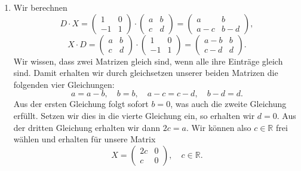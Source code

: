 \documentclass[german,12pt]{homework}
\newcommand{\RR}{\mathbb{R}}
\DeclarePairedDelimiter{\enbrace}{(}{)}
\begin{document}
\begin{enumerate}
\begin{align*}
{\begin{pmatrix}
                0 \cdot \enbrace*{-12} + 2 \cdot \enbrace*{-4} + 1 \cdot 1 & 0 \cdot 8 + 2 \cdot \enbrace*{-7} + 1 \cdot 12\\
            \end{pmatrix}\)}\\
            &= \begin{pmatrix}
                -29 & -3\\
                -7 & -2
            \end{pmatrix}.
        \end{align*}
        Somit ist gezeigt, dass die Multiplikation assoziativ ist.
        \item Wir berechnen
        \[D \cdot X = \begin{pmatrix}
            1 & 0\\
            -1 & 1
        \end{pmatrix} \cdot \begin{pmatrix}
            a & b\\
            c & d
        \end{pmatrix} = \begin{pmatrix}
            a & b\\
            a - c & b - d
        \end{pmatrix},\]
        \[X \cdot D = \begin{pmatrix}
            a & b\\
            c & d
        \end{pmatrix} \cdot \begin{pmatrix}
            1 & 0\\
            -1 & 1
        \end{pmatrix} = \begin{pmatrix}
            a - b & b\\
            c - d & d
        \end{pmatrix}.\]
        Wir wissen, dass zwei Matrizen gleich sind, wenn alle ihre Einträge gleich sind. Damit erhalten wir durch gleichsetzen unserer beiden Matrizen die folgenden vier Gleichungen:
        \[a = a - b, \quad b = b, \quad a - c = c - d, \quad b - d = d.\]
        Aus der ersten Gleichung folgt sofort \(b = 0\), was auch die zweite Gleichung erfüllt. Setzen wir dies in die vierte Gleichung ein, so erhalten wir \(d = 0\). Aus der dritten Gleichung erhalten wir dann \(2c = a\). Wir können also \(c \in \RR\) frei wählen und erhalten für unsere Matrix
        \[X = \begin{pmatrix}
            2c & 0\\
            c & 0
        \end{pmatrix}, \quad c \in \RR.\]
    \end{enumerate}
\end{document}
